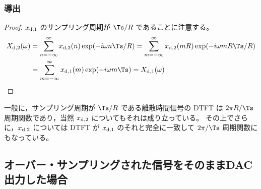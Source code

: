             \subsubsection{導出}
                \begin{proof}
                    \quad\par
                    $x_{\text{d},1}$ のサンプリング周期が $\Ts/R$ であることに注意する。
                    \begin{align*}
                        \Xdb(\omega) &= \sum_{n=-\infty}^\infty \xdb(n)\exp(-i\omega n\Ts/R) = \sum_{m=-\infty}^\infty \xdb(m R) \exp(-i\omega m R\Ts/R) \\
                        &= \sum_{m=-\infty}^\infty \xda(m) \exp(-i\omega m\Ts) = \Xda(\omega)
                    \end{align*}
                \end{proof}
                一般に，サンプリング周期が $\Ts/R$ である離散時間信号の DTFT は $2\pi R/\Ts$ 周期関数であり，当然 $x_{\text{d},2}$ についてもそれは成り立っている。
                その上でさらに，$x_{\text{d},2}$ については DTFT が $x_{\text{d},1}$ のそれと完全に一致して $2\pi/\Ts$ 周期関数にもなっている。
        \subsection{オーバー・サンプリングされた信号をそのままDAC出力した場合}
